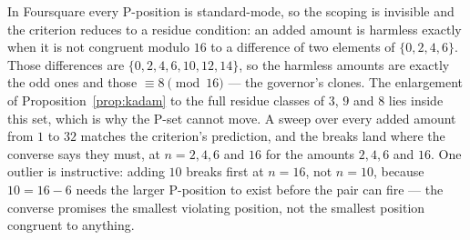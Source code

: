 \begin{corollary}\label{cor:kadam-revisited}
In Foursquare every P-position is standard-mode, so the scoping is
invisible and the criterion reduces to a residue condition: an added
amount is harmless exactly when it is not congruent modulo $16$ to a
difference of two elements of $\{0, 2, 4, 6\}$. Those differences are
$\{0, 2, 4, 6, 10, 12, 14\}$, so the harmless amounts are exactly the odd
ones and those $\equiv 8 \pmod{16}$ --- the governor's clones. The
enlargement of Proposition~\ref{prop:kadam} to the full residue classes
of $3$, $9$ and $8$ lies inside this set, which is why the P-set cannot
move. A sweep over every added amount from $1$ to $32$ matches the
criterion's prediction, and the breaks land where the
converse says they must, at $n = 2, 4, 6$ and $16$ for the amounts
$2, 4, 6$ and $16$. One outlier is instructive: adding $10$ breaks first
at $n = 16$, not $n = 10$, because $10 = 16 - 6$ needs the larger
P-position to exist before the pair can fire --- the converse promises
the smallest violating position, not the smallest position congruent to
anything.
\end{corollary}

